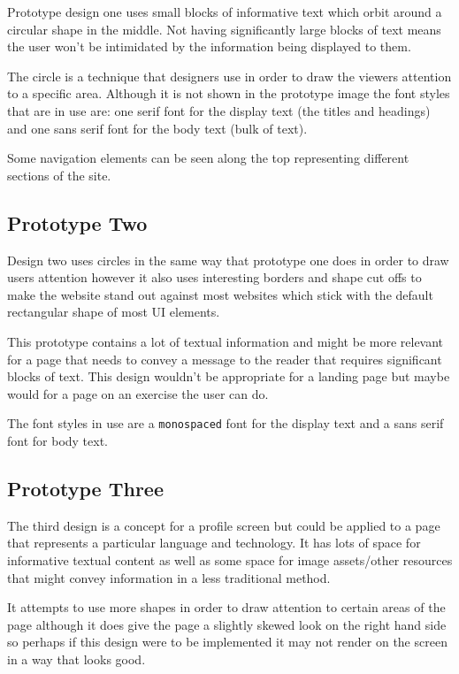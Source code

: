 Prototype design one uses small blocks of informative text which orbit around a circular shape in the middle. Not having significantly large blocks of text means the user won't be intimidated by the information being displayed to them.

The circle is a technique that designers use in order to draw the viewers attention to a specific area. Although it is not shown in the prototype image the font styles that are in use are: one serif font for the display text (the titles and headings) and one sans serif font for the body text (bulk of text).

Some navigation elements can be seen along the top representing different sections of the site.

\subsection{Prototype Two}

Design two uses circles in the same way that prototype one does in order to draw users attention however it also uses interesting borders and shape cut offs to make the website stand out against most websites which stick with the default rectangular shape of most UI elements.

This prototype contains a lot of textual information and might be more relevant for a page that needs to convey a message to the reader that requires significant blocks of text. This design wouldn't be appropriate for a landing page but maybe would for a page on an exercise the user can do.

The font styles in use are a \texttt{monospaced} font for the display text and a sans serif font for body text.

\subsection{Prototype Three}

The third design is a concept for a profile screen but could be applied to a page that represents a particular language and technology. It has lots of space for informative textual content as well as some space for image assets/other resources that might convey information in a less traditional method.

It attempts to use more shapes in order to draw attention to certain areas of the page although it does give the page a slightly skewed look on the right hand side so perhaps if this design were to be implemented it may not render on the screen in a way that looks good.

